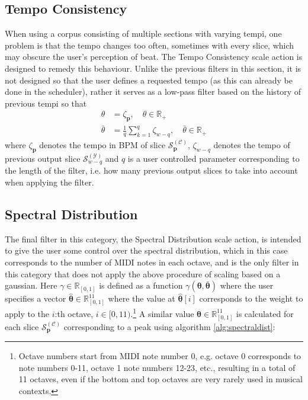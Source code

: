 \subsection{Tempo Consistency}
When using a corpus consisting of multiple sections with varying tempi, one problem is that the tempo changes too often, sometimes with every slice, which may obscure the user's perception of beat. The Tempo Consistency scale action is designed to remedy this behaviour. Unlike the previous filters in this section, it is not designed so that the user defines a requested tempo (as this can already be done in the scheduler), rather it serves as a low-pass filter based on the history of previous tempi so that
	\begin{align}
		\theta &= \zeta_{\bm p}, \quad \theta \in \mathbb R_+ \\
		\bar{\theta} &= \frac{1}{q}\sum_{k=1}^q \zeta_{w-q}, \quad \bar{\theta} \in \mathbb R_+
	\end{align} 
	where $\zeta_{\bm p}$ denotes the tempo in BPM of slice $\mathcal S^{(\mathcal C)}_{\bm p}$, $\zeta_{w-q}$ denotes the tempo of previous output slice $\mathcal S^{(\mathcal Y)}_{w-q}$ and $q$ is a user controlled parameter corresponding to the length of the filter, i.e. how many previous output slices to take into account when applying the filter. 

\subsection{Spectral Distribution}
The final filter in this category, the Spectral Distribution scale action, is intended to give the user some control over the spectral distribution, which in this case corresponds to the number of MIDI notes in each octave, and is the only filter in this category that does not apply the above procedure of scaling based on a gaussian. Here $\gamma \in \mathbb R_{[0,1]}$ is defined as a function $\gamma \left( \bm{\theta}, \bm{\bar \theta}\right)$ where the user specifies a vector $\bm{\hat \theta} \in \mathbb R^{11}_{[0,1]}$ where the value at $\bm{\hat\theta}[i]$ corresponds to the weight to apply to the $i$:th octave, $i \in [0, 11)$.\footnote{Octave numbers start from MIDI note number 0, e.g. octave 0 corresponds to note numbers 0-11, octave 1 note numbers 12-23, etc., resulting in a total of 11 octaves, even if the bottom and top octaves are very rarely used in musical contexts.} A similar value $\bm{\theta} \in \mathbb R^{11}_{[0,1]}$ is calculated for each slice $\mathcal S^{(\mathcal C)}_{\bm p}$ corresponding to a peak using algorithm \ref{alg:spectraldist}:

